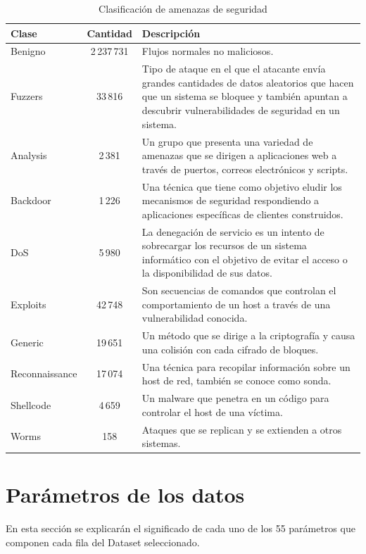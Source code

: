 \begin{table}[H]
\begin{tabular}{|l|c|>{\RaggedRight}p{10cm}|} %
\hline
\rowcolor[HTML]{C0C0C0} 
\textbf{Clase} & \textbf{Cantidad} & \textbf{Descripción} \\ \hline
Benigno & 2\,237\,731 & Flujos normales no maliciosos. \\ \hline
Fuzzers & 33\,816 & Tipo de ataque en el que el atacante envía grandes cantidades de datos aleatorios que hacen que un sistema se bloquee y también apuntan a descubrir vulnerabilidades de seguridad en un sistema. \\ \hline
Analysis & 2\,381 & Un grupo que presenta una variedad de amenazas que se dirigen a aplicaciones web a través de puertos, correos electrónicos y scripts. \\ \hline
Backdoor & 1\,226 & Una técnica que tiene como objetivo eludir los mecanismos de seguridad respondiendo a aplicaciones específicas de clientes construidos. \\ \hline
DoS & 5\,980 & La denegación de servicio es un intento de sobrecargar los recursos de un sistema informático con el objetivo de evitar el acceso o la disponibilidad de sus datos. \\ \hline
Exploits & 42\,748 & Son secuencias de comandos que controlan el comportamiento de un host a través de una vulnerabilidad conocida. \\ \hline
Generic & 19\,651 & Un método que se dirige a la criptografía y causa una colisión con cada cifrado de bloques. \\ \hline
Reconnaissance & 17\,074 & Una técnica para recopilar información sobre un host de red, también se conoce como sonda. \\ \hline
Shellcode & 4\,659 & Un malware que penetra en un código para controlar el host de una víctima. \\ \hline
Worms & 158 & Ataques que se replican y se extienden a otros sistemas. \\ \hline
\end{tabular}
\centering
\caption{Clasificación de amenazas de seguridad} 
\label{tab:attacks-tab}
\end{table}

\section{Parámetros de los datos} \label{sec.param-datos}
En esta sección se explicarán el significado de cada uno de los 55 parámetros que componen cada fila del Dataset seleccionado.


